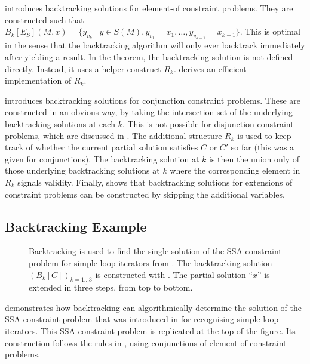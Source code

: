      introduces backtracking solutions for element-of
    constraint problems.
    They are constructed such that
    $B_k[E_S](M,x)=\{y_{v_k}\mid y\in S(M), y_{v_1}=x_1,\dots,y_{v_{k-1}}=x_{k-1}\}$.
    This is optimal in the sense that the backtracking algorithm will only ever
    backtrack immediately after yielding a result.
    In the theorem, the backtracking solution is not defined directly.
    Instead, it uses a helper construct $R_k$.
     derives an efficient implementation of $R_k$.

     introduces backtracking solutions for conjunction
    constraint problems.
    These are constructed in an obvious way, by taking the intersection set of
    the underlying backtracking solutions at each $k$.
    This is not possible for disjunction constraint problems, which are
    discussed in .
    The additional structure $R_k$ is used to keep track of whether the current
    partial solution satisfies $C$ or $C'$ so far
    (this was a given for conjunctions).
    The backtracking solution at $k$ is then the union only of those underlying
    backtracking solutions at $k$ where the corresponding element in $R_k$
    signals validity.
    Finally,  shows that backtracking solutions for extensions
    of constraint problems can be constructed by skipping the
    additional variables.

\subsection{Backtracking Example}

\begin{figure}[p]
    
    \caption{Backtracking is used to find the single solution of the
             SSA constraint problem for simple loop iterators from
             .
             The backtracking solution $(B_k[C])_{k=1\dots3}$ is constructed
             with .
             The partial solution ``$x$''  is extended in three steps, from top
             to bottom.}
    \label{fig:backtracsol}
\end{figure}

     demonstrates how backtracking can algorithmically
    determine the solution of the SSA constraint problem that was introduced in
     for recognising simple loop iterators.
    This SSA constraint problem is replicated at the top of the figure.
    Its construction follows the rules in
    , using conjunctions
    of element-of constraint problems.

